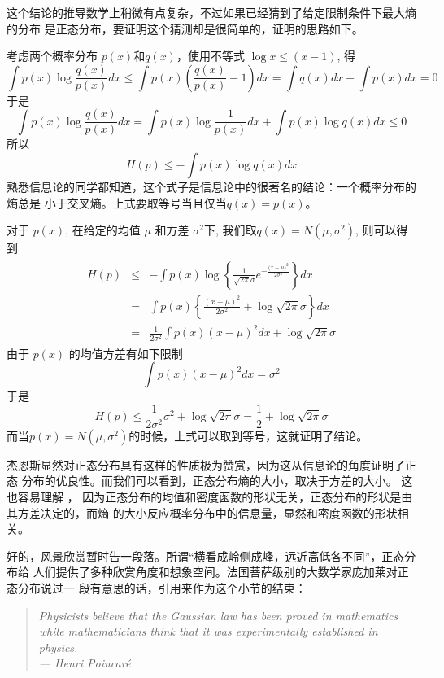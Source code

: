 这个结论的推导数学上稍微有点复杂，不过如果已经猜到了给定限制条件下最大熵的分布
是正态分布，要证明这个猜测却是很简单的，证明的思路如下。

考虑两个概率分布 $p(x)$和$q(x)$，使用不等式 $\log x \le (x-1) $, 得
$$ \int p(x) \log \frac{q(x)}{p(x)} dx \le \int p(x) (\frac{q(x)}{p(x)} - 1) dx
= \int q(x) dx - \int p(x) dx = 0 $$
于是
$$ \int p(x) \log \frac{q(x)}{p(x)} dx = \int p(x) \log\frac{1}{p(x)}dx + \int p(x) \log q(x) dx \le 0 $$
所以
\begin{equation}
 H(p) \le -\int p(x) \log q(x) dx
\end{equation}
熟悉信息论的同学都知道，这个式子是信息论中的很著名的结论：一个概率分布的熵总是
小于交叉熵。上式要取等号当且仅当$q(x)=p(x)$。

对于 $p(x)$, 在给定的均值 $\mu$ 和方差 $\sigma^2$下, 我们取$q(x)=N(\mu,
\sigma^2)$, 则可以得到
\begin{eqnarray}
\begin{array}{lll}
 H(p) &  \le &\displaystyle - \int p(x) \log \left\{ \frac{1}{\sqrt{2\pi}\sigma}
 e^{-\frac{{(x-\mu})^2}{2\sigma^2}}\right\} dx \\
 & = & \displaystyle \int p(x) \left\{ \frac{(x-\mu)^2}{2\sigma^2}  + \log \sqrt{2\pi}\sigma \right\} dx \\
 & = & \displaystyle \frac{1}{2\sigma^2} \int p(x)(x-\mu)^2 dx + \log \sqrt{2\pi}\sigma
\end{array}
\end{eqnarray}
由于 $p(x)$ 的均值方差有如下限制
$$ \int p(x) (x-\mu)^2 dx = \sigma^2$$
于是
$$  H(p) \le \frac{1}{2\sigma^2}\sigma^2 + \log \sqrt{2\pi}\sigma  =  \frac{1}{2} + \log \sqrt{2\pi}\sigma $$
而当$p(x)=N(\mu, \sigma^2)$的时候，上式可以取到等号，这就证明了结论。


杰恩斯显然对正态分布具有这样的性质极为赞赏，因为这从信息论的角度证明了正态
分布的优良性。而我们可以看到，正态分布熵的大小，取决于方差的大小。 这也容易理解
， 因为正态分布的均值和密度函数的形状无关，正态分布的形状是由其方差决定的，而熵
的大小反应概率分布中的信息量，显然和密度函数的形状相关。

好的，风景欣赏暂时告一段落。所谓“横看成岭侧成峰，远近高低各不同”，正态分布给
人们提供了多种欣赏角度和想象空间。法国菩萨级别的大数学家庞加莱对正态分布说过一
段有意思的话，引用来作为这个小节的结束：
\begin{quotation}
\emph{
Physicists believe that the Gaussian law has been proved in mathematics
while mathematicians think that it was experimentally established in physics. }
\\
\emph{--- Henri Poincar\'{e}}
\end{quotation}

